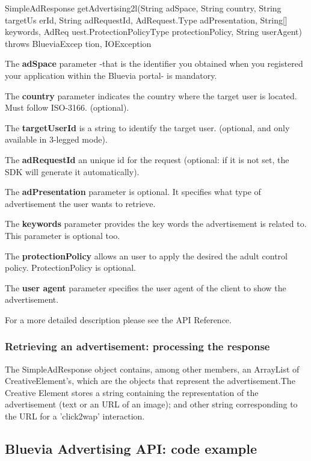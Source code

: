 \begin{DoxyCode}
SimpleAdResponse getAdvertising2l(String adSpace, String country, String targetUs
      erId, String adRequestId, AdRequest.Type adPresentation, String[] keywords, AdReq
      uest.ProtectionPolicyType protectionPolicy, String userAgent) throws BlueviaExcep
      tion, IOException
\end{DoxyCode}


The {\bfseries adSpace} parameter -\/that is the identifier you obtained when you registered your application within the Bluevia portal-\/ is mandatory.\par
 The {\bfseries country} parameter indicates the country where the target user is located. Must follow ISO-\/3166. (optional). \par
 The {\bfseries targetUserId} is a string to identify the target user. (optional, and only available in 3-\/legged mode). \par
 The {\bfseries adRequestId} an unique id for the request (optional: if it is not set, the SDK will generate it automatically).\par
 The {\bfseries adPresentation} parameter is optional. It specifies what type of advertisement the user wants to retrieve.\par
 The {\bfseries keywords} parameter provides the key words the advertisement is related to. This parameter is optional too. \par
 The {\bfseries protectionPolicy} allows an user to apply the desired the adult control policy. ProtectionPolicy is optional.\par
 The {\bfseries user agent} parameter specifies the user agent of the client to show the advertisement.\par


For a more detailed description please see the API Reference.\hypertarget{blv_ad_guide_processing_ad_response_sec}{}\subsubsection{Retrieving an advertisement: processing the response}\label{blv_ad_guide_processing_ad_response_sec}
The SimpleAdResponse object contains, among other members, an ArrayList of CreativeElement's, which are the objects that represent the advertisement.The Creative Element stores a string containing the representation of the advertisement (text or an URL of an image); and other string corresponding to the URL for a 'click2wap' interaction.\hypertarget{blv_ad_guide_advertising_code_example_sec}{}\subsection{Bluevia Advertising API: code example}\label{blv_ad_guide_advertising_code_example_sec}

